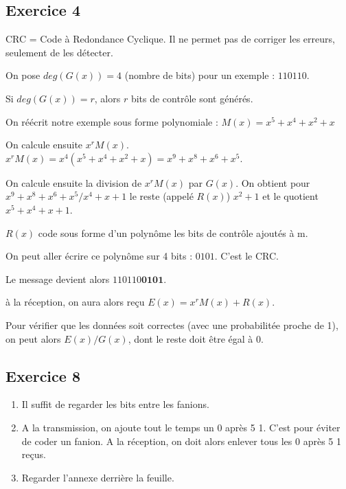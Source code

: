 \subsection{Exercice 4}

CRC = Code à Redondance Cyclique. Il ne permet pas de corriger les erreurs, seulement de les détecter.

On pose $deg(G(x)) = 4$ (nombre de bits) pour un exemple : $110110$.

Si $deg(G(x)) = r$, alors $r$ bits de contrôle sont générés.

On réécrit notre exemple sous forme polynomiale : $M(x) = x^5+x^4+x^2+x$

On calcule ensuite $x^rM(x)$. $x^rM(x)=x^4(x^5+x^4+x^2+x)=x^9+x^8+x^6+x^5$.

On calcule ensuite la division de $x^rM(x)$ par $G(x)$. On obtient pour $x^9+x^8+x^6+x^5 / x^4+x+1$ le reste (appelé $R(x)$) $x^2+1$ et le quotient $x^5+x^4+x+1$.

$R(x)$ code sous forme d'un polynôme les bits de contrôle ajoutés à m.

On peut aller écrire ce polynôme sur 4 bits : $0101$. C'est le CRC.

Le message devient alors $110110\textbf{0101}$.

à la réception, on aura alors reçu $E(x)=x^rM(x)+R(x)$.

Pour vérifier que les données soit correctes (avec une probabilitée proche de 1), on peut alors $E(x) / G(x)$, dont le reste doit être égal à 0.

\subsection{Exercice 8}

\begin{enumerate}
\item Il suffit de regarder les bits entre les fanions.
\item A la transmission, on ajoute tout le temps un 0 après 5 1. C'est pour éviter de coder un fanion. A la réception, on doit alors enlever tous les 0 après 5 1 reçus.
\item Regarder l'annexe derrière la feuille.
\end{enumerate}

